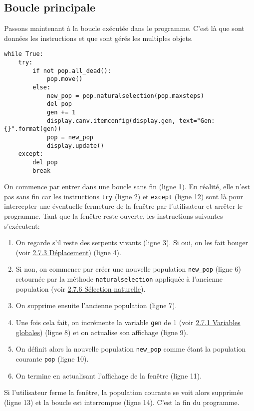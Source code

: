 \documentclass[12pt, a4paper, openany]{book}
\begin{document}
\subsection{Boucle principale}
Passons maintenant à la boucle exécutée dans le programme. C'est là que sont données les instructions et que sont gérés les multiples objets.
\begin{verbatim}
while True:
    try:
        if not pop.all_dead():
            pop.move()
        else:
            new_pop = pop.naturalselection(pop.maxsteps)
            del pop
            gen += 1
            display.canv.itemconfig(display.gen, text="Gen: {}".format(gen))
            pop = new_pop
            display.update()
    except:
        del pop
        break
\end{verbatim}
On commence par entrer dans une boucle sans fin (ligne 1). En réalité, elle n'est pas sans fin car les instructions \verb'try' (ligne 2) et \verb'except' (ligne 12) sont là pour intercepter une éventuelle fermeture de la fenêtre par l'utilisateur et arrêter le programme.\newline
Tant que la fenêtre reste ouverte, les instructions suivantes s’exécutent:
\begin{enumerate}
	\item On regarde s'il reste des serpents vivants (ligne 3). Si oui, on les fait bouger (voir \hyperref[r:2.7.3-dep]{2.7.3 Déplacement}) (ligne 4).
	\item Si non, on commence par créer une nouvelle population \verb'new_pop' (ligne 6) retournée par la méthode \verb'naturalselection' appliquée à l'ancienne population (voir \hyperref[r:2.7.6-sel]{2.7.6 Sélection naturelle}).
	\item On supprime ensuite l'ancienne population (ligne 7).
	\item Une fois cela fait, on incrémente la variable \verb'gen' de 1 (voir \hyperref[r:2.7.1-var]{2.7.1 Variables globales}) (ligne 8) et on actualise son affichage (ligne 9).
	\item On définit alors la nouvelle population \verb'new_pop' comme étant la population courante \verb'pop' (ligne 10).
	\item On termine en actualisant l'affichage de la fenêtre (ligne 11).
\end{enumerate}
Si l'utilisateur ferme la fenêtre, la population courante se voit alors supprimée (ligne 13) et la boucle est interrompue (ligne 14). C'est la fin du programme.
\end{document}
